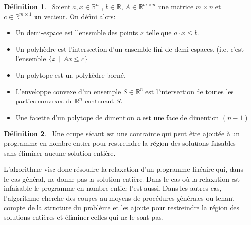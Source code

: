 \documentclass[12pt,a4paper,oneside]{book}
\theoremstyle{definition}
\newtheorem{definition}{Définition}[section]
\newcommand{\R}{\mathbb{R}}
\begin{document}
		\begin{definition}\
            Soient $a,x \in \R^n$ , $b \in \R $, $A \in \R^{m \times n}$ une matrice $m \times n$ et $c \in \R^{m \times 1}$ un vecteur. On défini alors:
            \begin{itemize}
                \item Un demi-espace est l'ensemble des points $x$ telle que $a \cdot x \leq b $.
                \item Un polyhèdre est l'intersection d'un ensemble fini de demi-espaces. (i.e. c'est l'ensemble $\{x \hspace{5pt} | \hspace{5pt} Ax \leq c \}$
                \item Un polytope est un polyhèdre borné.
                \item L'enveloppe convexe d'un ensemple $S \in \R^n$ est l'intersection de toutes les parties convexes de $\R^n$ contenant $S$.
                \item Une facette d'un polytope de dimention $n$ est une face de dimention $(n-1)$
            \end{itemize}
        \end{definition} 
        
        \begin{definition} \
            Une coupe sécant est une contrainte qui peut être ajoutée à un programme en nombre entier pour restreindre la région des solutions faisables sans éliminer aucune solution entière. \cite{MORRISON201679}
        \end{definition}
		     L'algorithme vise donc résoudre la relaxation d'un programme linéaire qui, dans le cas général, ne donne pas la solution entière. Dans le cas où la relaxation est infaisable le programme en nombre entier l'est aussi. Dans les autres cas, l'algorithme cherche des coupes au moyens de procédures générales ou tenant compte de la structure du problème et les ajoute pour restreindre la région des solutions entières et éliminer celles qui ne le sont pas.
\end{document}
